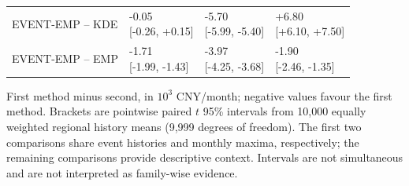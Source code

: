 \begin{table}[tbp]
\begin{tabular}{@{}llll@{}}
EVENT-EMP -- KDE & \shortstack{-0.05\\{}[-0.26, +0.15]} & \shortstack{-5.70\\{}[-5.99, -5.40]} & \shortstack{+6.80\\{}[+6.10, +7.50]}\\
EVENT-EMP -- EMP & \shortstack{-1.71\\{}[-1.99, -1.43]} & \shortstack{-3.97\\{}[-4.25, -3.68]} & \shortstack{-1.90\\{}[-2.46, -1.35]}\\
\bottomrule
\end{tabular}
\par\smallskip\noindent\begin{minipage}{\linewidth}\footnotesize First method minus second, in $10^3$ CNY/month; negative values favour the first method. Brackets are pointwise paired $t$ 95\% intervals from 10,000 equally weighted regional history means (9,999 degrees of freedom). The first two comparisons share event histories and monthly maxima, respectively; the remaining comparisons provide descriptive context. Intervals are not simultaneous and are not interpreted as family-wise evidence.\end{minipage}
\end{table}
\endgroup
